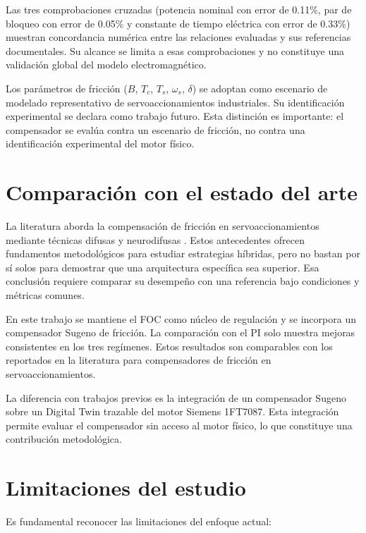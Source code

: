 Las tres comprobaciones cruzadas (potencia nominal con error de 0.11\%, par de bloqueo con error de 0.05\% y constante de tiempo eléctrica con error de 0.33\%) muestran concordancia numérica entre las relaciones evaluadas y sus referencias documentales. Su alcance se limita a esas comprobaciones y no constituye una validación global del modelo electromagnético.

Los parámetros de fricción ($B$, $T_c$, $T_s$, $\omega_s$, $\delta$) se adoptan como escenario de modelado representativo de servoaccionamientos industriales. Su identificación experimental se declara como trabajo futuro. Esta distinción es importante: el compensador se evalúa contra un escenario de fricción, no contra una identificación experimental del motor físico.

\section{Comparación con el estado del arte}
\label{sec:cap6_estado_arte}

La literatura aborda la compensación de fricción en servoaccionamientos mediante técnicas difusas \cite{shieh2000adaptive} y neurodifusas \cite{jang1993anfis}. Estos antecedentes ofrecen fundamentos metodológicos para estudiar estrategias híbridas, pero no bastan por sí solos para demostrar que una arquitectura específica sea superior. Esa conclusión requiere comparar su desempeño con una referencia bajo condiciones y métricas comunes.

En este trabajo se mantiene el FOC como núcleo de regulación y se incorpora un compensador Sugeno de fricción. La comparación con el PI solo muestra mejoras consistentes en los tres regímenes. Estos resultados son comparables con los reportados en la literatura para compensadores de fricción en servoaccionamientos.

La diferencia con trabajos previos es la integración de un compensador Sugeno sobre un Digital Twin trazable del motor Siemens 1FT7087. Esta integración permite evaluar el compensador sin acceso al motor físico, lo que constituye una contribución metodológica.

\section{Limitaciones del estudio}
\label{sec:cap6_limitaciones}

Es fundamental reconocer las limitaciones del enfoque actual:

